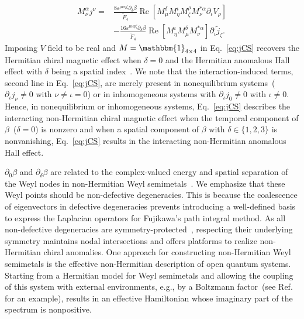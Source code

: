 \documentclass[prl,aps,showpacs,twocolumn,preprintnumbers,
amsmath,amssymb,superscriptaddress,longbibliography]{revtex4-1}
\def\id{\mathbbm{1}}
\renewcommand{\Re}{\mathop{\mathrm{Re}}}
\begin{document}
\begin{align}
    M_{\nu}^{\alpha} j^{\nu}
    =&
     \frac{8\varepsilon^{\mu \nu \eta \zeta} \partial_{\delta} \beta}{\tilde{F}_{4}} 
     \Re \left[ M_{\mu}^{ \delta} M_{\eta}^{\iota} M_{\zeta}^{ \rho} M_{\nu}^{*\alpha} \partial_{\iota} V_{\rho} \right]
     \nonumber \\
     &
     -\frac{16\varepsilon^{\mu \nu \eta \zeta} \partial_{\delta} \beta}{\tilde{F}_{4}} 
     \Re \left[ M_{\eta}^{\iota} M_{\mu}^{\delta} M_{\nu}^{*\alpha} \right]
     \partial_{\iota} \tilde{j}_{\zeta} .
     \label{eq:jCS}
\end{align}
Imposing $V$ field to be real and $M=\id_{4\times4}$ in Eq.~\eqref{eq:jCS} recovers the Hermitian chiral magnetic effect when $\delta=0$ and the Hermitian anomalous Hall effect with $\delta$ being a spatial index~\cite{Zyuzin2012}. 
We note that the interaction-induced terms, second line in Eq.~\eqref{eq:jCS}, are merely present in nonequilibrium systems~($\partial_{\iota} j_{\nu} \neq 0$ with $\nu \neq \iota =0$) or in inhomogeneous systems with $\partial_{\iota} j_{0} \neq 0$ with $\iota \neq 0$.
Hence, in nonequilibrium or inhomogeneous systems, Eq.~\eqref{eq:jCS} describes the interacting non-Hermitian chiral magnetic effect when the temporal component of $\beta$~($\delta=0$) is nonzero and when a spatial component of $\beta$ with $\delta \in \{1,2,3\}$ is nonvanishing, Eq.~\eqref{eq:jCS} results in the interacting non-Hermitian anomalous Hall effect. 



 $\partial_{0}\beta$ and $\partial_{\delta}\beta$ are related to the complex-valued energy and spatial separation of the Weyl nodes in non-Hermitian Weyl semimetals~\cite{Sayyad2022ca}. We emphasize that these Weyl points should be non-defective degeneracies. This is because the coalescence of eigenvectors in defective degeneracies prevents introducing a well-defined basis to express the Laplacian operators for Fujikawa's path integral method. As all non-defective degeneracies are symmetry-protected~\cite{Sayyad2022pro}, respecting their underlying symmetry maintains nodal intersections and offers platforms to realize non-Hermitian chiral anomalies. One approach for constructing non-Hermitian Weyl semimetals is the effective non-Hermitian description of open quantum systems. Starting from a Hermitian model for Weyl semimetals and allowing the coupling of this system with external environments, e.g., by a Boltzmann factor~(see Ref.~\cite{Nuske2020} for an example), results in an effective Hamiltonian whose imaginary part of the spectrum is nonpositive.  
\end{document}
